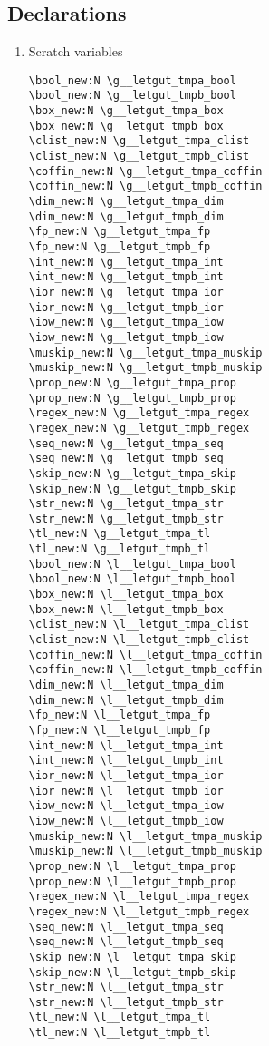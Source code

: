 \documentclass{letgut}
\begin{document}
\subsection{Declarations}
\label{ImplementationDeclarations-3j8g55h0jlj0}
\begin{enumerate}
\item Scratch variables
\label{ImplementationDeclarationsScratchvariables-onuajq01p4k0}
\begin{lstlisting}
\bool_new:N \g__letgut_tmpa_bool
\bool_new:N \g__letgut_tmpb_bool
\box_new:N \g__letgut_tmpa_box
\box_new:N \g__letgut_tmpb_box
\clist_new:N \g__letgut_tmpa_clist
\clist_new:N \g__letgut_tmpb_clist
\coffin_new:N \g__letgut_tmpa_coffin
\coffin_new:N \g__letgut_tmpb_coffin
\dim_new:N \g__letgut_tmpa_dim
\dim_new:N \g__letgut_tmpb_dim
\fp_new:N \g__letgut_tmpa_fp
\fp_new:N \g__letgut_tmpb_fp
\int_new:N \g__letgut_tmpa_int
\int_new:N \g__letgut_tmpb_int
\ior_new:N \g__letgut_tmpa_ior
\ior_new:N \g__letgut_tmpb_ior
\iow_new:N \g__letgut_tmpa_iow
\iow_new:N \g__letgut_tmpb_iow
\muskip_new:N \g__letgut_tmpa_muskip
\muskip_new:N \g__letgut_tmpb_muskip
\prop_new:N \g__letgut_tmpa_prop
\prop_new:N \g__letgut_tmpb_prop
\regex_new:N \g__letgut_tmpa_regex
\regex_new:N \g__letgut_tmpb_regex
\seq_new:N \g__letgut_tmpa_seq
\seq_new:N \g__letgut_tmpb_seq
\skip_new:N \g__letgut_tmpa_skip
\skip_new:N \g__letgut_tmpb_skip
\str_new:N \g__letgut_tmpa_str
\str_new:N \g__letgut_tmpb_str
\tl_new:N \g__letgut_tmpa_tl
\tl_new:N \g__letgut_tmpb_tl
\bool_new:N \l__letgut_tmpa_bool
\bool_new:N \l__letgut_tmpb_bool
\box_new:N \l__letgut_tmpa_box
\box_new:N \l__letgut_tmpb_box
\clist_new:N \l__letgut_tmpa_clist
\clist_new:N \l__letgut_tmpb_clist
\coffin_new:N \l__letgut_tmpa_coffin
\coffin_new:N \l__letgut_tmpb_coffin
\dim_new:N \l__letgut_tmpa_dim
\dim_new:N \l__letgut_tmpb_dim
\fp_new:N \l__letgut_tmpa_fp
\fp_new:N \l__letgut_tmpb_fp
\int_new:N \l__letgut_tmpa_int
\int_new:N \l__letgut_tmpb_int
\ior_new:N \l__letgut_tmpa_ior
\ior_new:N \l__letgut_tmpb_ior
\iow_new:N \l__letgut_tmpa_iow
\iow_new:N \l__letgut_tmpb_iow
\muskip_new:N \l__letgut_tmpa_muskip
\muskip_new:N \l__letgut_tmpb_muskip
\prop_new:N \l__letgut_tmpa_prop
\prop_new:N \l__letgut_tmpb_prop
\regex_new:N \l__letgut_tmpa_regex
\regex_new:N \l__letgut_tmpb_regex
\seq_new:N \l__letgut_tmpa_seq
\seq_new:N \l__letgut_tmpb_seq
\skip_new:N \l__letgut_tmpa_skip
\skip_new:N \l__letgut_tmpb_skip
\str_new:N \l__letgut_tmpa_str
\str_new:N \l__letgut_tmpb_str
\tl_new:N \l__letgut_tmpa_tl
\tl_new:N \l__letgut_tmpb_tl
\end{lstlisting}
\end{enumerate}
\end{document}
